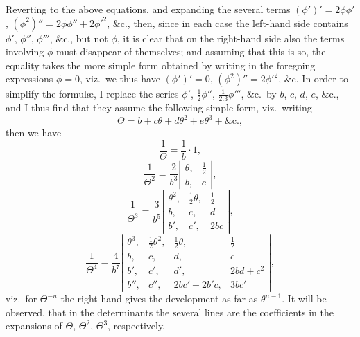 \documentclass[11pt]{article}
\begin{document}
Reverting to the above equations, and expanding the several terms $(\phi')'=2\phi\phi'$, $(\phi^{2})''=2\phi\phi''+2\phi'^{2}$, \&c., then, since in each case the left-hand side contains $\phi'$, $\phi''$, $\phi'''$, \&c., but not $\phi$, it is clear that on the right-hand side also the terms involving $\phi$ must disappear of themselves; and assuming that this is so, the equality takes the more simple form obtained by writing in the foregoing expressions $\phi=0$, viz.\ we thus have $(\phi')'=0$, $(\phi^{2})''=2\phi'^{2}$, \&c. In order to simplify the formul\ae, I replace the series $\phi'$, $\tfrac{1}{2}\phi''$, $\tfrac{1}{2.3}\phi'''$, \&c.\ by $b$, $c$, $d$, $e$, \&c., and I thus find that they assume the following simple form, viz.\ writing
\[
\Theta = b + c\theta + d\theta^{2} + e\theta^{3} + \&\mathrm{c.},
\]
then we have
\[
\frac{1}{\Theta} = \frac{1}{b}\cdot 1,
\]
\[
\frac{1}{\Theta^{2}} = \frac{2}{b^{3}}\left|\begin{array}{cc}\theta,&\tfrac{1}{2}\\ b,&c\end{array}\right|,
\]
\[
\frac{1}{\Theta^{3}} = \frac{3}{b^{5}}\left|\begin{array}{ccc}\theta^{2},&\tfrac{1}{2}\theta,&\tfrac{1}{2}\\ b,&c,&d\\ b',&c',&2b c\end{array}\right|,
\]
\[
\frac{1}{\Theta^{4}} = \frac{4}{b^{7}}\left|\begin{array}{cccc}\theta^{3},&\tfrac{1}{2}\theta^{2},&\tfrac{1}{2}\theta,&\tfrac{1}{2}\\ b,&c,&d,&e\\ b',&c',&d',&2bd+c^{2}\\ b'',&c'',&2bc'+2b'c,&3b c'\end{array}\right|,
\]
viz.\ for $\Theta^{-n}$ the right-hand gives the development as far as $\theta^{n-1}$. It will be observed, that in the determinants the several lines are the coefficients in the expansions of $\Theta$, $\Theta^{2}$, $\Theta^{3}$, respectively.
\end{document}
